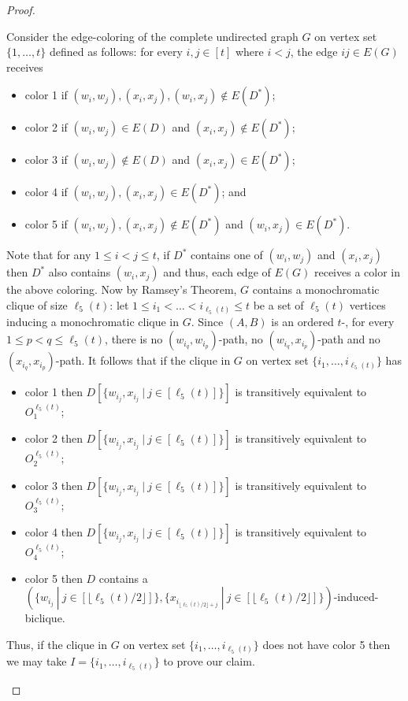 \begin{proof}
\begin{claimproof}
Consider the edge-coloring of the complete undirected graph $G$ on vertex set $\{1,\ldots,t\}$ defined as follows: for every $i,j \in [t]$ where $i < j$, the edge $ij \in E(G)$ receives 
\begin{itemize}
\item color 1 if $(w_i,w_j),(x_i,x_j),(w_i,x_j) \notin E(D^*)$;
\item color 2 if $(w_i,w_j) \in E(D)$ and $(x_i,x_j) \notin E(D^*)$;
\item color 3 if $(w_i,w_j) \notin E(D)$ and $(x_i,x_j) \in E(D^*)$;
\item color 4 if $(w_i,w_j),(x_i,x_j) \in E(D^*)$; and
\item color 5 if $(w_i,w_j),(x_i,x_j) \notin E(D^*)$ and $(w_i,x_j) \in E(D^*)$.
\end{itemize}
Note that for any $1 \leq i<j \leq t$, if $D^*$ contains one of $(w_i,w_j)$ and $(x_i,x_j)$ then $D^*$ also contains $(w_i,x_j)$ and thus, each edge of $E(G)$ receives a color in the above coloring.
Now by Ramsey's Theorem, $G$ contains a monochromatic clique of size $\ell_5(t)$: let $1 \leq i_1 < \ldots < i_{\ell_5(t)} \leq t$ be a set of $\ell_5(t)$ vertices inducing a monochromatic clique in $G$. Since $(A,B)$ is an ordered $t$-\toughpair, for every $1 \leq p < q \leq \ell_5(t)$, there is no $(w_{i_q},w_{i_p})$-path, no $(w_{i_q},x_{i_p})$-path and no $(x_{i_q},x_{i_p})$-path. It follows that if the clique in $G$ on vertex set $\{i_1,\ldots,i_{\ell_5(t)}\}$ has 
\begin{itemize}
\item color 1 then $D[\{w_{i_j},x_{i_j}~|~ j \in [\ell_5(t)]\}]$ is transitively equivalent to $O^{\ell_5(t)}_1$;
\item color 2 then $D[\{w_{i_j},x_{i_j}~|~ j \in [\ell_5(t)]\}]$ is transitively equivalent to $O^{\ell_5(t)}_2$;
\item color 3 then $D[\{w_{i_j},x_{i_j}~|~ j \in [\ell_5(t)]\}]$ is transitively equivalent to $O^{\ell_5(t)}_3$;
\item color 4 then $D[\{w_{i_j},x_{i_j}~|~ j \in [\ell_5(t)]\}]$ is transitively equivalent to $O^{\ell_5(t)}_4$;
\item color 5 then $D$ contains a $(\{w_{i_j}~|~j \in [\lfloor \ell_5(t)/2 \rfloor]\},\{x_{i_{\lfloor \ell_5(t)/2 \rfloor + j}}~|~j \in [\lfloor \ell_5(t)/2 \rfloor]\})$-induced-biclique.
\end{itemize}
Thus, if the clique in $G$ on vertex set $\{i_1,\ldots,i_{\ell_5(t)}\}$ does not have color 5 then we may take $I = \{i_1,\ldots,i_{\ell_5(t)}\}$ to prove our claim.  
\end{claimproof}


\end{proof}
